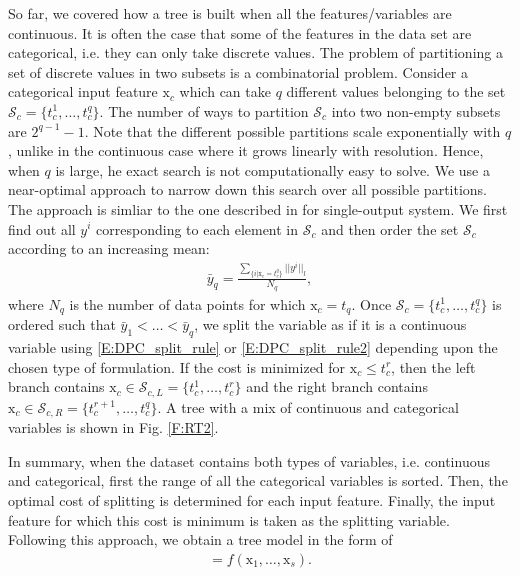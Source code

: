 So far, we covered how a tree is built when all the features/variables are continuous. 
It is often the case that some of the features in the data set are categorical, i.e. they can only take discrete values. 
The problem of partitioning a set of discrete values in two subsets is a combinatorial problem. 
Consider a categorical input feature $\mathrm{x}_c$ which can take $q$ different values belonging to the set $\mathcal{S}_c=\{t_c^1,\dots,t_c^q \}$. 
The number of ways to partition $\mathcal{S}_c$ into two non-empty subsets are $2^{q-1}-1$. 
Note that the different possible partitions scale exponentially with $q$, unlike in the continuous case where it grows linearly with resolution. Hence, when $q$ is large, he exact search is not computationally easy to solve. 
We use a near-optimal approach to narrow down this search over all possible partitions. 
The approach is simliar to the one described in \cite{Ripley2007} for single-output system. 
We first find out all $y^i$ corresponding to each element in $\mathcal{S}_c$ and then order the set $\mathcal{S}_c$ according to an increasing mean:
\begin{gather}
\label{E:DPC_cat_split_rule}
\bar{y}_q = \frac{\displaystyle\sum_{\{i|\mathrm{x}_c=t_c^q\}} ||y^i||_l}{N_q},
\end{gather}
where $N_q$ is the number of data points for which $\mathrm{x}_c=t_q$. 
Once $\mathcal{S}_c=\{t_c^1,\dots,t_c^q \}$ is ordered such that 
$\bar{y}_1< \dots < \bar{y}_q$, we split the variable as if it is a continuous variable using \eqref{E:DPC_split_rule} or \eqref{E:DPC_split_rule2} depending upon the chosen type of formulation. 
If the cost is minimized for $\mathrm{x}_c \leq t_c^r$, then the left branch contains $\mathrm{x}_c \in \mathcal{S}_{c,L} = \{ t_c^1,\dots,t_c^r \}$ and the right branch contains $\mathrm{x}_c \in \mathcal{S}_{c,R} = \{ t_c^{r+1},\dots,t_c^q \}$. 
A tree with a mix of continuous and categorical variables is shown in Fig. \ref{F:RT2}. 

In summary, when the dataset contains both types of variables, i.e. continuous and categorical, first the range of all the categorical variables is sorted. 
Then, the optimal cost of splitting is determined for each input feature. 
Finally, the input feature for which this cost is minimum is taken as the splitting variable. Following this approach, we obtain a tree model in the form of
\begin{gather}
[\mathrm{y}_1, \dots, \mathrm{y}_N] = f \left( \mathrm{x}_1, \dots, \mathrm{x}_s \right).
 \label{eq:regtree_multi}
\end{gather}

